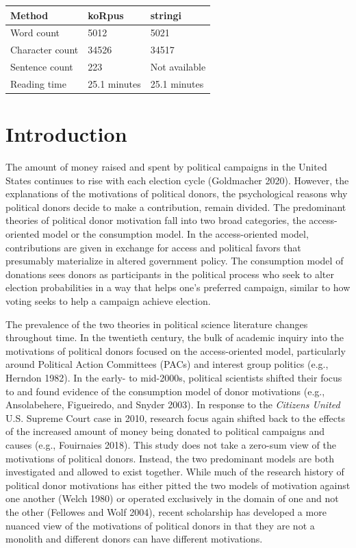 \documentclass[12pt,]{article}
\begin{document}
\vskip -8.5pt



\noindent \doublespacing 

\begin{longtable}[]{@{}lll@{}}
\toprule
Method & koRpus & stringi\tabularnewline
\midrule
\endhead
Word count & 5012 & 5021\tabularnewline
Character count & 34526 & 34517\tabularnewline
Sentence count & 223 & Not available\tabularnewline
Reading time & 25.1 minutes & 25.1 minutes\tabularnewline
\bottomrule
\end{longtable}

\newpage

\hypertarget{introduction}{%
\section{Introduction}\label{introduction}}

The amount of money raised and spent by political campaigns in the
United States continues to rise with each election cycle (Goldmacher
2020). However, the explanations of the motivations of political donors,
the psychological reasons why political donors decide to make a
contribution, remain divided. The predominant theories of political
donor motivation fall into two broad categories, the access-oriented
model or the consumption model. In the access-oriented model,
contributions are given in exchange for access and political favors that
presumably materialize in altered government policy. The consumption
model of donations sees donors as participants in the political process
who seek to alter election probabilities in a way that helps one's
preferred campaign, similar to how voting seeks to help a campaign
achieve election.

The prevalence of the two theories in political science literature
changes throughout time. In the twentieth century, the bulk of academic
inquiry into the motivations of political donors focused on the
access-oriented model, particularly around Political Action Committees
(PACs) and interest group politics (e.g., Herndon 1982). In the early-
to mid-2000s, political scientists shifted their focus to and found
evidence of the consumption model of donor motivations (e.g.,
Ansolabehere, Figueiredo, and Snyder 2003). In response to the
\emph{Citizens United} U.S. Supreme Court case in 2010, research focus
again shifted back to the effects of the increased amount of money being
donated to political campaigns and causes (e.g., Fouirnaies 2018). This
study does not take a zero-sum view of the motivations of political
donors. Instead, the two predominant models are both investigated and
allowed to exist together. While much of the research history of
political donor motivations has either pitted the two models of
motivation against one another (Welch 1980) or operated exclusively in
the domain of one and not the other (Fellowes and Wolf 2004), recent
scholarship has developed a more nuanced view of the motivations of
political donors in that they are not a monolith and different donors
can have different motivations.
\end{document}
